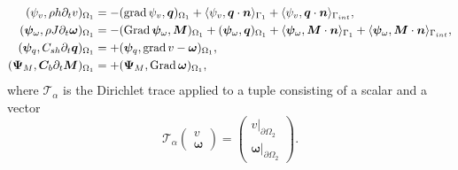 \documentclass[11pt,a4paper]{article}
\DeclareMathOperator*{\grad}{grad}
\DeclareMathOperator*{\Grad}{Grad}
\newcommand{\innerproduct}[3][\Omega]{(#2, #3)_{#1}}
\newcommand{\boundary}[3][\partial\Omega]{\langle #2, #3\rangle_{#1}}
\begin{document}
\begin{equation}
    \begin{split}
    \begin{alignedat}{2}
        \innerproduct[\Omega_1]{\psi_v}{\rho h \partial_t v} &= - \innerproduct[\Omega_1]{\grad\psi_v}{\bm{q}} + \boundary[\Gamma_1]{\psi_v}{\bm{q} \cdot \bm{n}} + \boundary[\Gamma_{\rm int}]{\psi_v}{\bm{q} \cdot \bm{n}}, \\
        \innerproduct[\Omega_1]{\bm\psi_\omega}{\rho J \partial_t \bm{\omega}} &= - \innerproduct[\Omega_1]{\Grad\bm\psi_\omega}{\bm{M}} + \innerproduct[\Omega_1]{\bm\psi_\omega}{\bm{q}} + \boundary[\Gamma_1]{\bm{\psi}_\omega}{\bm{M}\cdot \bm{n}} + \boundary[\Gamma_{\rm int}]{\bm{\psi}_\omega}{\bm{M}\cdot \bm{n}}, \\
        \innerproduct[\Omega_1]{\bm{\psi}_q}{C_{\rm sh }\partial_t\bm{q}} &= +\innerproduct[\Omega_1]{\bm{\psi}_q}{\grad v - \bm{\omega}},\\
        \innerproduct[\Omega_1]{\bm{\Psi}_M}{\bm{C}_b\partial_t\bm{M}} &=+\innerproduct[\Omega_1]{\bm{\Psi}_M}{\Grad \bm{\omega}}, \\
    \end{alignedat}
    \end{split}
\label{eq:Mindlin-weak-N}
\end{equation}
where $\mathcal{T}_\alpha$ is the Dirichlet trace applied to a tuple consisting of a scalar and a vector
$$
\mathcal{T}_\alpha \begin{pmatrix}
    v \\
    \bm{\omega}
\end{pmatrix} = 
\begin{pmatrix}
    v\vert_{\partial\Omega_2}\\
    \bm{\omega}\vert_{\partial\Omega_2}
\end{pmatrix}.
$$
\end{document}
